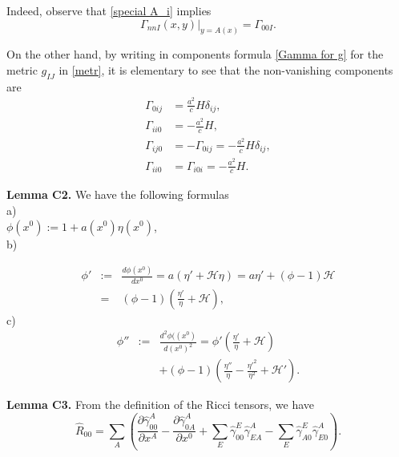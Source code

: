 \documentclass[aps,superscriptaddress, showpacs,preprintnumbers, superscriptaddress, nofootinbibt,twocolumn]{revtex4-2}
\begin{document}
Indeed, observe that \eqref{special A_i} implies
$$
\Gamma_{nnI}(x,y)|_{y=A(x)}=\Gamma_{00I}.
$$

On the other hand, by writing in components formula \eqref{Gamma for g} for the metric $g_{IJ}$ in \eqref{metr}, it is elementary to see that the non-vanishing components are
\begin{equation*}
    \begin{split}
        \Gamma_{0ij} &=\frac{a^2}{c}H\delta_{ij},\\
    \Gamma_{ii0}&=-\frac{a^2}{c}H,\\
    \Gamma_{ij0}&=-\Gamma_{0ij}=-\frac{a^2}{c}H\delta_{ij},\\
    \Gamma_{ii0}&=\Gamma_{i0i}=-\frac{a^2}{c}H.
    \end{split}
\end{equation*}


{\bf Lemma C2.}
We have the following formulas\\

a)\\

     $\phi\left(x^0\right):=1+a\left(x^0\right)\eta\left(x^0\right)$,\\


b)

     \begin{eqnarray*}\phi '&:=&\frac{d\phi \left(x^0\right)}{dx^0}=a\left(\eta '+\mathcal{H}\eta \right)=a\eta '+(\phi-1)\mathcal{H}\nonumber\\
                   &=&(\phi-1)\left(\frac{\eta '}{\eta} +\mathcal{H}\right),\end{eqnarray*}
\hspace{0.2cm} c)
     \begin{eqnarray*}\phi''&:=&\frac{d^2\phi (\left(x^0\right)}{d\left(x^0\right)^2}=\phi'\left(\frac{\eta '}{\eta} +\mathcal{H}\right)\\
    &&+(\phi-1)\left(\frac{\eta ''}{\eta}-\frac{\eta '^2}{\eta ^2}+\mathcal{H}'\right).\end{eqnarray*}


{\bf Lemma C3.}
From the definition of the Ricci tensors, we have
\begin{equation*}
    \hat{R}_{00}=\sum_A\left(\frac{\partial \hat{\gamma}_{00}^A}{\partial x^A}-\frac{\partial \hat{\gamma}_{0A}^A}{\partial x^0}
    +\sum_E
    \hat{\gamma}^E_{00}\hat{\gamma}^A_{EA}-\sum_E \hat{\gamma}^E_{A0}\hat{\gamma}^A_{E0}
    \right).
\end{equation*}
\end{document}

